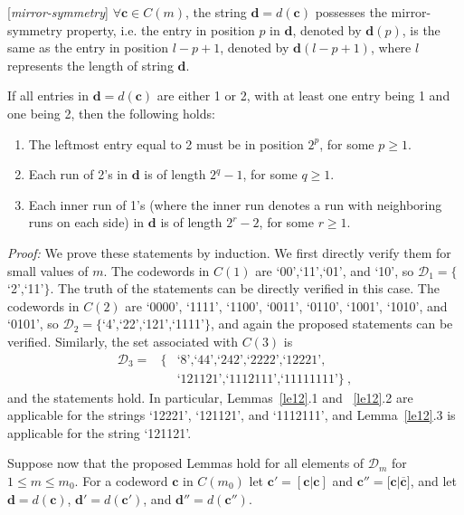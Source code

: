 \begin{lemma}\label{le11} [\textit{mirror-symmetry}] $\forall \mathbf{c} \in C(m)$, the
string $\mathbf{d} = d(\mathbf{c})$
possesses the mirror-symmetry property, i.e.
the entry in position $p$ in $\mathbf{d}$, denoted by
$\mathbf{d}(p)$, is the same as the entry in position $l-p+1$,
denoted by $\mathbf{d}(l-p+1)$, where $l$ represents the length
of string $\mathbf{d}$.
\end{lemma}
\begin{lemma}\label{le12} If all entries in $\mathbf{d} = d(\mathbf{c})$ are either 1 or 2,
with at least one entry being 1 and one being 2, then the
following holds: \begin{enumerate} \item The leftmost entry equal
to 2 must be in position $2^p$, for some $p \geq 1$. \item Each
run of 2's in $\mathbf{d}$ is of length $2^q-1$, for some $q \geq
1$. \item Each inner run of 1's (where the inner run denotes a run
with neighboring runs on each side) in $\mathbf{d}$ is of length
$2^r-2$, for some $r \geq 1$.
\end{enumerate}
\end{lemma}
\noindent \textit{Proof:} We prove these statements by induction.
We first directly verify them for small values of $m$. The
codewords in $C(1)$ are `00',`11',`01', and `10', so
$\mathcal{D}_1=\{$`2',`11'$\}$. The truth of the statements can be
directly verified in this case. The codewords in $C(2)$ are
`0000', `1111', `1100', `0011', `0110', `1001', `1010', and
`0101', so $\mathcal{D}_2=\{$`4',`22',`121',`1111'$\}$, and again
the proposed statements can be verified. Similarly, the set
associated with $C(3)$ is
\begin{eqnarray*}
\mathcal{D}_3=&\{&\text{`8',`44',`242',`2222',`12221'},\\
{}&{}&\text{`121121',`1112111',`11111111'}\}~,
\end{eqnarray*}
and the statements hold. In particular, Lemmas~\ref{le12}.1 and
~\ref{le12}.2 are applicable for the strings `12221', `121121',
and `1112111', and Lemma~\ref{le12}.3 is applicable for the string
`121121'.

Suppose now that the proposed Lemmas hold for all elements of
$\mathcal{D}_{m}$ for $1 \le m \le m_0$. For a codeword
$\mathbf{c}$ in $C(m_0)$ let $\mathbf{c'} = [\mathbf{c} |
\mathbf{c}]$ and $\mathbf{c''} = [\mathbf{c} |$$
\overline{\mathbf{c}}]$, and let $\mathbf{d}=d(\mathbf{c})$,
$\mathbf{d'}=d(\mathbf{c'})$, and $\mathbf{d''}=d(\mathbf{c''})$.

